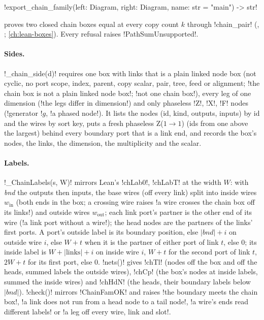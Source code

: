{\begin{signature}
\py!export_chain_family(left: Diagram, right: Diagram, name: str = "main") -> str!
\end{signature}
\noindent proves two closed chain boxes equal at every copy count $k$ through \lean!chain_pair!
(, ; \cref{ch:lean-boxes}). Every
refusal raises \py!PathSumUnsupported!.

\paragraph{Sides.} \py!_chain_side(d)! requires one box with links that is a plain linked node
box (not cyclic, no port scope, index, parent, copy scalar, pair, tree, feed or alignment;
\code!the chain box is not a plain linked node box!; \code!not one chain box!), every leg of one
dimension (\code!the legs differ in dimension!) and only phaseless \code!Z!, \code!X!, \code!F!
nodes (\code!generator !$g$, \code!a phased node!). It lists the nodes (id, kind, outputs,
inputs) by id and the wires by sort key, puts a fresh phaseless Z($1\to1$) (ids from one above
the largest) behind every boundary port that is a link end, and records the box's nodes, the
links, the dimension, the multiplicity and the scalar.

\paragraph{Labels.} \py!_ChainLabels(s, W)! mirrors Lean's \lean!chLab0!, \lean!chLabT! at the
width $W$: with \textit{bnd} the outputs then inputs, the base wires (off every link) split into
inside wires $w_{\mathrm{in}}$ (both ends in the box; a crossing wire raises
\code!a wire crosses the chain box off its links!) and outside wires $w_{\mathrm{out}}$; each link
port's partner is the other end of its wire (\code!a link port without a wire!); the head nodes
are the partners of the links' first ports. A port's outside label is its boundary position, else
$|\textit{bnd}| + i$ on outside wire $i$, else $W + t$ when it is the partner of either port of
link $t$, else 0; its inside label is $W + |\text{links}| + i$ on inside wire $i$, $W + t$ for the
second port of link $t$, $2W + t$ for its first port, else 0. \py!nets()! gives \lean!chTl!
(nodes off the box and off the heads, summed labels the outside wires), \lean!chCp! (the box's
nodes at inside labels, summed the inside wires) and \lean!chHdN! (the heads, their boundary
labels below $|\textit{bnd}|$). \py!check()! mirrors \lean!ChainFamOK! and raises
\code!the boundary meets the chain box!, \code!a link does not run from a head node to a tail node!,
\code!a wire's ends read different labels! or \code!a leg off every wire, link and slot!.

}
